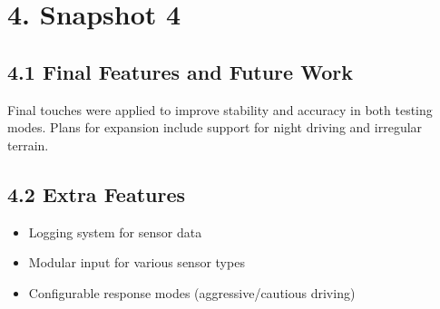 \documentclass[8pt]{article}
\begin{document}
\section*{4. Snapshot 4}
\subsection*{4.1 Final Features and Future Work}
Final touches were applied to improve stability and accuracy in both testing modes. Plans for expansion include support for night driving and irregular terrain.

\subsection*{4.2 Extra Features}
\begin{itemize}[label=\textbullet]
  \item Logging system for sensor data
  \item Modular input for various sensor types
  \item Configurable response modes (aggressive/cautious driving)
\end{itemize}
\end{document}
